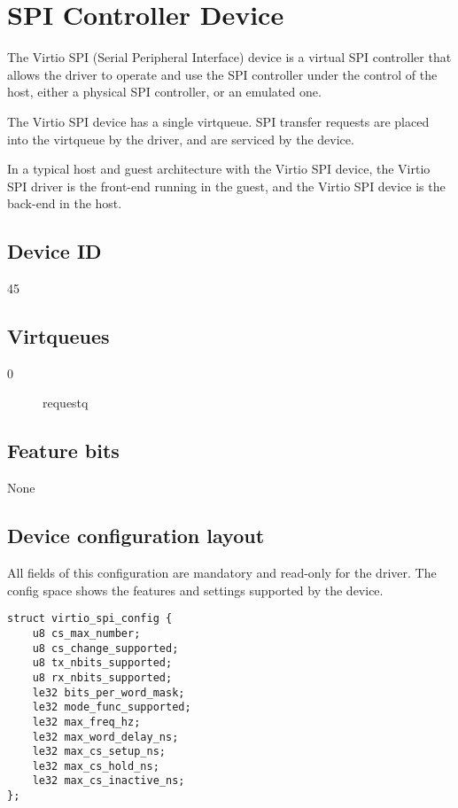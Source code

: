 \section{SPI Controller Device}\label{sec:Device Types / SPI Controller Device}

The Virtio SPI (Serial Peripheral Interface) device is a virtual SPI controller that
allows the driver to operate and use the SPI controller under the control of the host,
either a physical SPI controller, or an emulated one.

The Virtio SPI device has a single virtqueue. SPI transfer requests are placed into
the virtqueue by the driver, and are serviced by the device.

In a typical host and guest architecture with the Virtio SPI device, the Virtio SPI driver
is the front-end running in the guest, and the Virtio SPI device is the back-end
in the host.

\subsection{Device ID}\label{sec:Device Types / SPI Controller Device / Device ID}
45

\subsection{Virtqueues}\label{sec:Device Types / SPI Controller Device / Virtqueues}

\begin{description}
\item[0] requestq
\end{description}

\subsection{Feature bits}\label{sec:Device Types / SPI Controller Device / Feature bits}

None

\subsection{Device configuration layout}\label{sec:Device Types / SPI Controller Device / Device configuration layout}

All fields of this configuration are mandatory and read-only for the driver.
The config space shows the features and settings supported by the device.

\begin{lstlisting}
struct virtio_spi_config {
	u8 cs_max_number;
	u8 cs_change_supported;
	u8 tx_nbits_supported;
	u8 rx_nbits_supported;
	le32 bits_per_word_mask;
	le32 mode_func_supported;
	le32 max_freq_hz;
	le32 max_word_delay_ns;
	le32 max_cs_setup_ns;
	le32 max_cs_hold_ns;
	le32 max_cs_inactive_ns;
};
\end{lstlisting}

